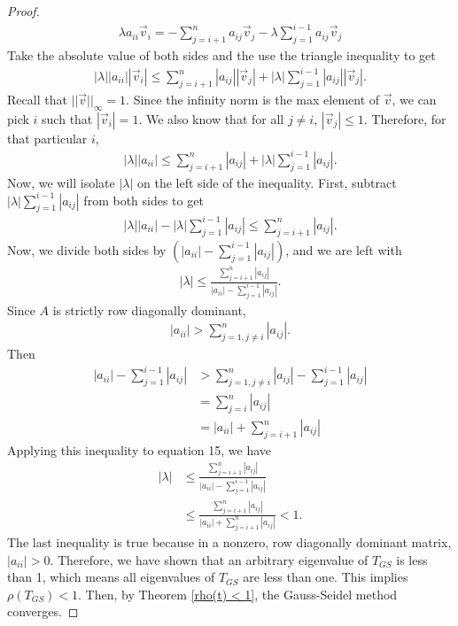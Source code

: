 \documentclass[12pt,letterpaper]{article}
\theoremstyle{definition}
\begin{document}
\begin{proof}
\begin{align*}
    \lambda a_{ii}\vec{v}_{i} = -\sum_{j=i + 1}^{n}a_{ij}\vec{v}_{j} - \lambda\sum_{j=1}^{i-1}a_{ij}\vec{v}_{j}
\end{align*}
Take the absolute value of both sides and the use the triangle inequality to get 
\begin{align*}
    |\lambda| |a_{ii}||\vec{v}_{i}| \leq \sum_{j=i + 1}^{n}|a_{ij}||\vec{v}_{j}| + |\lambda|\sum_{j=1}^{i-1}|a_{ij}||\vec{v}_{j}|.
\end{align*}
Recall that $||\vec{v}||_{\infty} = 1$. Since the infinity norm is the max element of $\vec{v}$, we can pick $i$ such that $|\vec{v}_{i}| = 1$. We also know that for all $j \neq i$, $|\vec{v}_{j}| \leq 1$. Therefore, for that particular $i$,
\begin{align*}
    |\lambda| |a_{ii}| \leq \sum_{j=i + 1}^{n}|a_{ij}| + |\lambda|\sum_{j=1}^{i-1}|a_{ij}|.
\end{align*}
Now, we will isolate $|\lambda|$ on the left side of the inequality. First, subtract $|\lambda|\sum_{j=1}^{i-1}|a_{ij}|$ from both sides to get
\begin{align*}
    |\lambda| |a_{ii}| - |\lambda|\sum_{j=1}^{i-1}|a_{ij}| \leq \sum_{j=i + 1}^{n}|a_{ij}|.
\end{align*}
Now, we divide both sides by $\left(|a_{ii}| - \sum_{j=1}^{i-1}|a_{ij}|\right)$, and we are left with
\begin{align}
    |\lambda|\leq \frac{\sum_{j=i + 1}^{n}|a_{ij}|}{|a_{ii}| - \sum_{j=1}^{i-1}|a_{ij}|}.
\end{align}
Since $A$ is strictly row diagonally dominant,
\begin{align*}
    |a_{ii}| > \sum_{j=1, j\neq i}^{n}|a_{ij}|.
\end{align*}
Then 
\begin{align*}
    |a_{ii}| - \sum_{j=1}^{i-1}|a_{ij}| &> \sum_{j=1, j\neq i}^{n}|a_{ij}| - \sum_{j=1}^{i-1}|a_{ij}| 
\\    &= \sum_{j=i}^{n}|a_{ij}| \\&= |a_{ii}| + \sum_{j=i+1}^{n}|a_{ij}|
\end{align*}
Applying this inequality to equation 15, we have
\begin{align*}
    |\lambda| &\leq \frac{\sum_{j=i + 1}^{n}|a_{ij}|}{|a_{ii}| - \sum_{j=1}^{i-1}|a_{ij}|}
\\    &\leq \frac{\sum_{j=i + 1}^{n}|a_{ij}|}{|a_{ii}| + \sum_{j=i + 1}^{n}|a_{ij}|} < 1.
\end{align*}
The last inequality is true because in a nonzero, row diagonally dominant matrix, $|a_{ii}| > 0$. Therefore, we have shown that an arbitrary eigenvalue of $T_{GS}$ is less than 1, which means all eigenvalues of $T_{GS}$ are less than one. This implies $\rho(T_{GS}) < 1$. Then, by Theorem \ref{rho(t) < 1}, the Gauss-Seidel method converges.
\end{proof}
\end{document}
